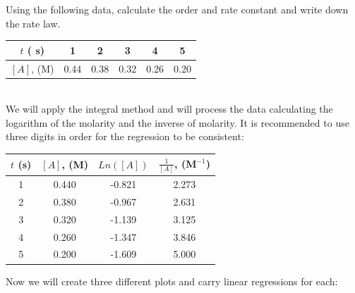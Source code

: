 \documentclass[main.tex]{subfiles}
\begin{document}
\begin{description}
\begin{example} %
Using the following data, calculate the order and rate constant and write down the rate law.
\begin{center}\begin{tabular}[t]{   c|  c cccc  }
\toprule
  $t$ ( s)	&  1&2&3&4&5 \\
  \midrule
  $[A]$, (M)&0.44 &0.38&0.32 &0.26 &0.20\\
\bottomrule
\end{tabular}\end{center}
\\
We will apply the integral method and will process the data calculating the logarithm of the molarity and the inverse of molarity. It is recommended to use three digits in order for the regression to be consistent:
\begin{center}\begin{tabular}[t]{   c  c cc  }
\toprule
  $t$ (s)	&$[A]$, (M) &$Ln([A])$&$\frac{1}{[A]}$, (M$^{-1}$)\\
\midrule
1      & 0.440&   -0.821 &2.273\\
2      & 0.380 &  -0.967 & 2.631\\
3       &0.320 &  -1.139 & 3.125\\
4       &0.260&   -1.347  &3.846\\
5       &0.200 &  -1.609 & 5.000\\
\bottomrule
\end{tabular}\end{center}
Now we will create three different plots and carry linear regressions for each:
 \tableLabel
{}


\end{example}
\end{description}
\end{document}
